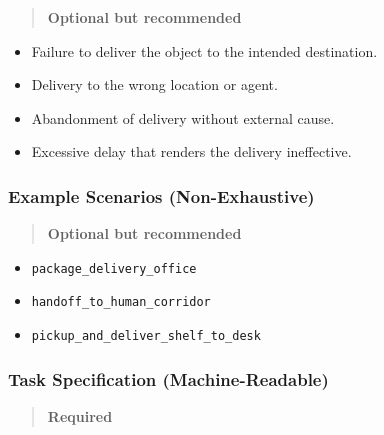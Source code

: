 \documentclass[utf8]{frontiers_suppmat} %
\providecommand{\tightlist}{%
  \setlength{\itemsep}{0pt}\setlength{\parskip}{0pt}}
\begin{document}
\begin{quote}
\textbf{Optional but recommended}
\end{quote}

\begin{itemize}
\tightlist
\item
  Failure to deliver the object to the intended destination.
\item
  Delivery to the wrong location or agent.
\item
  Abandonment of delivery without external cause.
\item
  Excessive delay that renders the delivery ineffective.
\end{itemize}

\subsubsection{Example Scenarios
(Non-Exhaustive)}\label{example-scenarios-non-exhaustive}

\begin{quote}
\textbf{Optional but recommended}
\end{quote}

\begin{itemize}
\tightlist
\item
  \texttt{package\_delivery\_office}
\item
  \texttt{handoff\_to\_human\_corridor}
\item
  \texttt{pickup\_and\_deliver\_shelf\_to\_desk}
\end{itemize}

\subsubsection{Task Specification
(Machine-Readable)}\label{task-specification-machine-readable}

\begin{quote}
\textbf{Required}
\end{quote}
\end{document}
